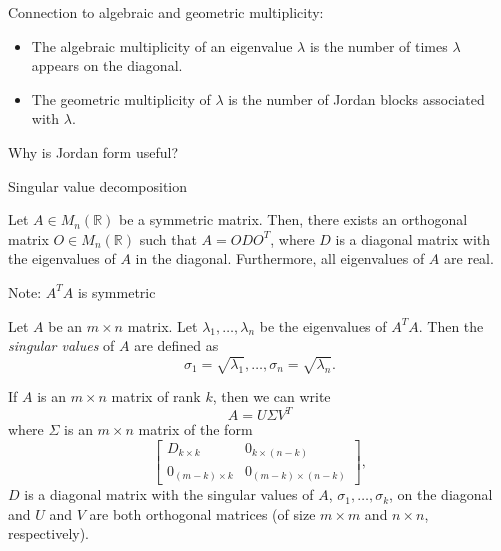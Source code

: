 \documentclass [aspectratio=169]{beamer}
\newcommand{\R}{{\mathbb{R}}}
\begin{document}
\begin{frame}
Connection to algebraic and geometric multiplicity:
\begin{itemize}
    \item The algebraic multiplicity of an eigenvalue $\lambda$ is the number of times $\lambda$ appears on the diagonal.
    \item The geometric multiplicity of $\lambda$ is the number of Jordan blocks associated with $\lambda$.
\end{itemize}
\vspace{1em}

Why is Jordan form useful?

\vspace{4cm}

\end{frame}


\begin{frame}{Singular value decomposition}

\begin{theorem}
Let $A\in M_n(\R)$ be a symmetric matrix. Then, there exists an orthogonal matrix $O\in M_n(\R)$ such that $A=ODO^T$, where $D$ is a diagonal matrix with the eigenvalues of $A$ in the diagonal. Furthermore, all eigenvalues of $A$ are real.
\end{theorem}

\vspace{1em}


Note: $A^T A$ is symmetric

\vspace{1em}

\begin{definition}
Let $A$ be an $m \times n$ matrix.  Let $\lambda_1, \ldots, \lambda_n$ be the eigenvalues of $A^T A$. Then the \emph{singular values} of $A$ are defined as
\begin{equation*}
    \sigma_1 = \sqrt{\lambda_1}, \ldots, \sigma_n = \sqrt{\lambda_n}.
\end{equation*}
\end{definition}
\end{frame}

\begin{frame}
\begin{theorem}
If $A$ is an $m \times n$ matrix of rank $k$, then we can write
$$ A = U \Sigma V^T$$
where $\Sigma$ is an $m \times n$ matrix of the form
$$ \begin{bmatrix} D_{k \times k} & 0_{k \times (n - k)} \\ 0_{(m -k) \times k} & 0_{(m -k) \times (n-k)} \end{bmatrix},$$
$D$ is a diagonal matrix with the singular values of $A$, $ \sigma_1, \ldots, \sigma_k$, on the diagonal and $U$ and $V$ are both orthogonal matrices (of size $m \times m$ and $n \times n$, respectively).
\end{theorem}
\end{frame}
\end{document}
